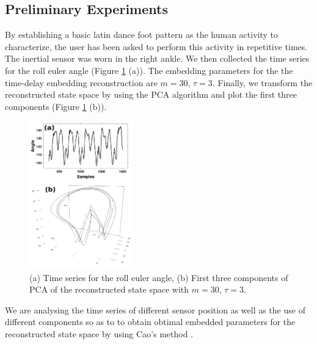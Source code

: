\documentclass{sigchi}
\begin{document}
\subsection{Preliminary Experiments}
By establishing a basic latin dance foot pattern as the human activity to characterize,
the user has been asked to perform this activity in repetitive times. 
The inertial sensor was worn in the right ankle.
We then collected the time series for the roll euler angle 
(Figure \ref{fig:example} (a)). 
The embedding parameters for the the time-delay embedding reconstruction 
are $m=30$, $\tau=3$. Finally, we transform the reconstructed state space
by using the PCA algorithm and plot the first three components
(Figure \ref{fig:example} (b)).
\begin{figure}[htbp!] 
\centering    
\includegraphics[width=0.4\textwidth]{experiments_v0}
\caption[PA]{(a) Time series for the roll euler angle, (b) 
First three components of PCA of the reconstructed state space with $m=30$, $\tau=3$.}
\label{fig:example}
\end{figure}
We are analysing the time series of different sensor position as well as 
the use of different components so as to to obtain obtimal embedded parameters
for the reconstructed state space by using Cao's method \cite{Cao1997}.
\end{document}
